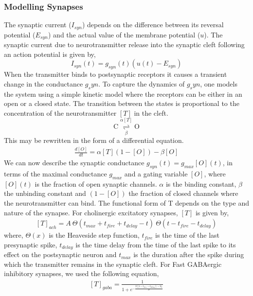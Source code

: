 \documentclass[10pt,letterpaper]{article}
\begin{document}
\subsubsection*{Modelling Synapses}

The synaptic current ($I_{syn}$) depends on the difference between its reversal potential ($E_{syn}$) and the actual value of the membrane potential ($u$). The synaptic current due to neurotransmitter release into the synaptic cleft following an action potential is given by,
\begin{equation}
I_{syn}(t)=g_{syn}(t)(u(t)−E_{syn})
\label{eq:syncurr}
\end{equation}
When the transmitter binds to postsynaptic receptors it causes a transient change in the conductance $g_syn$. To capture the dynamics of $g_syn$, one models the system using a simple kinetic model where the receptors can be either in an open or a closed state. The transition between the states is proportional to the concentration of the neurotransmitter $[T]$ in the cleft. 
\begin{equation}
\mathrm{C}\underset{\beta}{\stackrel{\alpha[T]}{\rightleftharpoons}} \mathrm{O}
\end{equation}
This may be rewritten in the form of a differential equation.
\begin{eqnarray}\label{d4_1}\frac{d[O]}{dt}=\alpha[T](1−[O])−\beta[O]\end{eqnarray}
We can now describe the synaptic conductance $g_{syn}(t)=g_{max}[O](t)$, in terms of the maximal conductance $g_{max}$ and a gating variable $[O]$, where $[O](𝑡)$ is the fraction of open synaptic channels. $\alpha$ is the binding constant, $\beta$ the unbinding constant and $(1−[O])$ the fraction of closed channels where the neurotransmitter can bind. The functional form of T depends on the type and nature of the synapse.
For cholinergic excitatory synapses, $[T]$ is given by,
\begin{eqnarray}
\label{d4_2}
[T]_{ach} = A\ \Theta(t_{max}+t_{fire}+t_{delay}-t)\ \Theta(t-t_{fire}-t_{delay})
\end{eqnarray}
where, $\Theta (x)$ is the Heaveside step function, $t_{fire}$ is the time of the last presynaptic spike, $t_{delay}$ is the time delay from the time of the last spike to its effect on the postsynaptic neuron and $t_{max}$ is the duration after the spike during which the transmitter remains in the synaptic cleft.
For Fast GABAergic inhibitory synapses, we used the following equation,
\begin{eqnarray}\label{d4_3}[T]_{gaba} = \frac{1}{1+e^{-\frac{V(t-t_{fire}-t_{delay})-V_0}{\sigma}}}\end{eqnarray}
\end{document}

